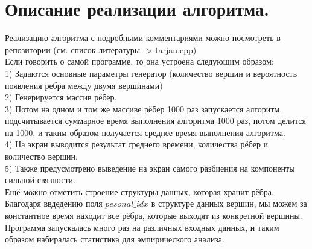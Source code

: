 \documentclass[oneside,final,14pt]{extreport}
\begin{document}
\newpage
\section{Описание реализации алгоритма.}

\noindent
Реализацию алгоритма с подробными комментариями можно посмотреть в 
репозитории (см. список литературы -> tarjan.cpp) \\
Если говорить о самой программе, то она устроена следующим образом:\\
1) Задаются основные параметры генератор (количество вершин и вероятность
появления ребра между двумя вершинами)\\
2) Генерируется массив рёбер.\\
3) Потом на одном и том же массиве рёбер 1000 раз запускается алгоритм,
подсчитывается суммарное время выполнения алгоритма 1000 раз, потом делится
на 1000, и таким образом получается среднее время выполнения алгоритма.\\
4) На экран выводится результат среднего времени, количества рёбер
и количество вершин.\\
5) Также предусмотрено выведение на экран самого разбиения на компоненты
сильной связности.\\
Ещё можно отметить строение структуры данных, которая хранит рёбра.
Благодаря ввдедению поля $pesonal\_idx$ в структуре данных вершин, мы можем
за константное время находит все рёбра, которые выходят из конкретной
вершины.\\
Программа запускалась много раз на различных входных данных, и таким
образом набиралась статистика для эмпирического анализа.


\newpage
\end{document}
